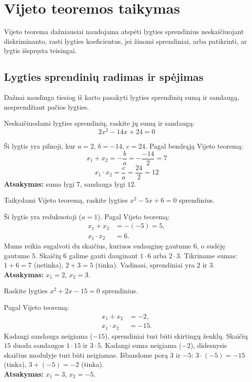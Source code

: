 \documentclass[11pt,a4paper]{scrartcl}
\begin{document}
\section{Vijeto teoremos taikymas}

Vijeto teorema dažniausiai naudojama atspėti lygties sprendinius neskaičiuojant diskriminanto, rasti lygties koeficientus, jei žinomi sprendiniai, arba patikrinti, ar lygtis išspręsta teisingai.

\subsection{Lygties sprendinių radimas ir spėjimas}

Dažnai naudinga tiesiog iš karto pasakyti lygties sprendinių sumą ir sandaugą, nesprendžiant pačios lygties.

\begin{example}
Neskaičiuodami lygties sprendinių, raskite jų sumą ir sandaugą:
\[ 2x^2 - 14x + 24 = 0 \]
\end{example}
\begin{solution}
Ši lygtis yra pilnoji, kur $a=2$, $b=-14$, $c=24$. Pagal bendrąją Vijeto teoremą:
\[
x_1 + x_2 = -\frac{b}{a} = -\frac{-14}{2} = 7
\]
\[
x_1 \cdot x_2 = \frac{c}{a} = \frac{24}{2} = 12
\]
\textbf{Atsakymas:} suma lygi $7$, sandauga lygi $12$.
\end{solution}

\begin{example}
Taikydami Vijeto teoremą, raskite lygties $x^2 - 5x + 6 = 0$ sprendinius.
\end{example}
\begin{solution}
Ši lygtis yra redukuotoji ($a=1$). Pagal Vijeto teoremą:
\[
\begin{aligned}
x_1 + x_2 &= -(-5) = 5, \\
x_1 \cdot x_2 &= 6.
\end{aligned}
\]
Mums reikia sugalvoti du skaičius, kuriuos sudauginę gautume $6$, o sudėję gautume $5$. 
Skaičių $6$ galime gauti dauginant $1 \cdot 6$ arba $2 \cdot 3$. 
Tikriname sumas:
$1 + 6 = 7$ (netinka),
$2 + 3 = 5$ (tinka).
Vadinasi, sprendiniai yra $2$ ir $3$.\\
\textbf{Atsakymas:} $x_1 = 2$, $x_2 = 3$.
\end{solution}

\begin{example}
Raskite lygties $x^2 + 2x - 15 = 0$ sprendinius.
\end{example}
\begin{solution}
Pagal Vijeto teoremą:
\[
\begin{aligned}
x_1 + x_2 &= -2, \\
x_1 \cdot x_2 &= -15.
\end{aligned}
\]
Kadangi sandauga neigiama ($-15$), sprendiniai turi būti skirtingų ženklų. 
Skaičių $15$ duoda sandaugos $1 \cdot 15$ ir $3 \cdot 5$. 
Kadangi suma neigiama ($-2$), didesnysis skaičius modulyje turi būti neigiamas.
Išbandome porą $3$ ir $-5$:
$3 \cdot (-5) = -15$ (tinka),
$3 + (-5) = -2$ (tinka).\\
\textbf{Atsakymas:} $x_1 = 3$, $x_2 = -5$.
\end{solution}
\end{document}
